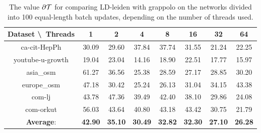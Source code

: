 \begin{table}[H]
	\centering
	\begin{tabular}{|c|c|c|c|c|c|c|c|}
		\hline
		Dataset \textbackslash\ Threads & 1 & 2 & 4 & 8 & 16 & 32 & 64 \\
		\hline
		ca-cit-HepPh & 30.09 & 29.60 & 37.84 & 37.74 & 31.55 & 21.24 & 22.25 \\
		\hline
		youtube-u-growth & 19.04 & 23.04 & 14.16 & 18.90 & 22.51 & 17.77 & 15.97 \\
		\hline
		asia\_osm & 61.27 & 36.56 & 25.38 & 28.59 & 27.17 & 28.85 & 30.20 \\
		\hline
		europe\_osm & 47.18 & 30.42 & 25.24 & 26.13 & 31.04 & 34.15 & 43.38 \\
		\hline
		com-lj & 43.78 & 47.36 & 39.49 & 42.40 & 38.10 & 29.86 & 24.08 \\
		\hline
		com-orkut & 56.03 & 43.64 & 40.80 & 43.18 & 43.42 & 30.75 & 21.79 \\
		\hline
		\textbf{Average}: & \textbf{42.90} & \textbf{35.10} & \textbf{30.49} & \textbf{32.82} & \textbf{32.30} & \textbf{27.10} & \textbf{26.28} \\
		\hline
	\end{tabular}
\caption{The value $\partial\mathcal{T}$ for comparing LD-leiden with grappolo on the networks divided into 100 equal-length batch updates, depending on the number of threads used.}
\label{T:scalling:ameanT:100:LD-leiden to grappolo}
\end{table}